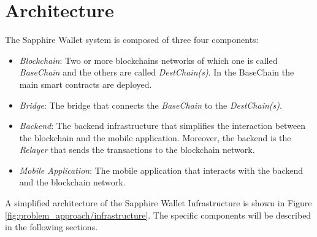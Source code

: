 \section{Architecture}
\label{sec:architecture}

The Sapphire Wallet system is composed of three four components:

\begin{itemize}
    \item \textit{Blockchain}: Two or more blockchains networks of which one is called \textit{BaseChain} and the others are called \textit{DestChain(s)}. In the BaseChain the main smart contracts are deployed.
    \item \textit{Bridge}: The bridge that connects the \textit{BaseChain} to the \textit{DestChain(s)}.
    \item \textit{Backend}: The backend infrastructure that simplifies the interaction between the blockchain and the mobile application. Moreover, the backend is the \textit{Relayer} that sends the transactions to the blockchain network.
    \item \textit{Mobile Application}: The mobile application that interacts with the backend and the blockchain network.
\end{itemize}

A simplified architecture of the Sapphire Wallet Infrastructure is shown in Figure \ref{fig:problem_approach/infrastructure}. The specific components will be described in the following sections.

